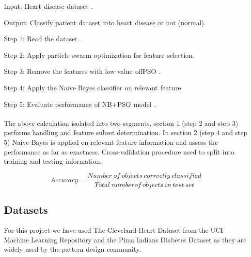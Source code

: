 \documentclass[oneside,12pt]{Classes/VTU}
\begin{document}
    Input: Heart\tiny\textcolor{white}{s}\normalsize disease\tiny\textcolor{white}{s}\normalsize dataset\tiny\textcolor{white}{s}\normalsize.
    
    Output: Classify patient\tiny\textcolor{white}{s}\normalsize dataset\tiny\textcolor{white}{s}\normalsize into heart\tiny\textcolor{white}{s}\normalsize disease or not (normal).
    
    Step 1: Read the dataset\tiny\textcolor{white}{s}\normalsize.
    
    Step 2: Apply particle\tiny\textcolor{white}{s}\normalsize swarm\tiny\textcolor{white}{s}\normalsize optimization for feature\tiny\textcolor{white}{s}\normalsize selection. 
    
    Step 3: Remove the features with low value\tiny\textcolor{white}{s}\normalsize of\tiny\textcolor{white}{f}\normalsize PSO\tiny\textcolor{white}{s}\normalsize.
    
    Step 4: Apply the Naive Bayes classifier\tiny\textcolor{white}{s}\normalsize on relevant\tiny\textcolor{white}{s}\normalsize feature. 
    
    Step 5: Evaluate performance\tiny\textcolor{white}{s}\normalsize of NB+PSO\tiny\textcolor{white}{s}\normalsize model\tiny\textcolor{white}{s}\normalsize.
    
    \paragraph{}
    The above calculation isolated into two segments, section 1 (step 2 and step 3) performs handling and feature subset determination. In section 2 (step 4 and step 5) Naive Bayes is applied on relevant feature information and assess the performance as far as exactness. Cross-validation procedure used to split\tiny\textcolor{white}{s}\normalsize into training and testing\tiny\textcolor{white}{s}\normalsize information.     
    \begin{center}
    	\[Accuracy = \frac{Number \ of \ objects \ correctly \ classified}{Total \ number of \ objects \ in  \ test \ set}\]     
    \end{center}
    
    
    \subsection{Datasets}
    For this project we have used The Cleveland Heart Dataset from the UCI Machine Learning Repository and the Pima Indians Diabetes Dataset as they are widely used by the pattern design community. 
    \linebreak
\end{document}
